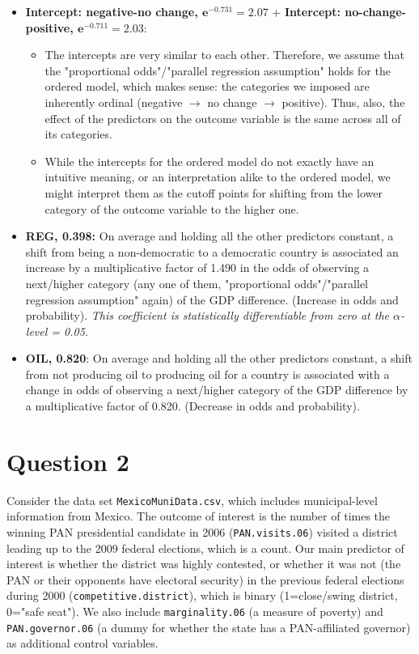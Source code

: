\documentclass[12pt,letterpaper]{article}
\begin{document}
\begin{itemize}
	\item \textbf{Intercept: negative-no change, \( \mathbf{e^{-0.731} = 2.07} \)} + \textbf{Intercept: no-change-positive, \( \mathbf{e^{-0.711} = 2.03} \)}: 
 \begin{itemize}
        \item The intercepts are very similar to each other. Therefore, we assume that the "proportional odds"/"parallel regression assumption" holds for the ordered model, which makes sense: the categories we imposed are inherently ordinal (negative $\rightarrow$ no change $\rightarrow$ positive). Thus, also, the effect of the predictors on the outcome variable is the same across all of its categories. 
        \item While the intercepts for the ordered model do not exactly have an intuitive meaning, or an interpretation alike to the ordered model, we might interpret them as the cutoff points for shifting from the lower category of the outcome variable to the higher one.
    \end{itemize} 
 
	\item \textbf{REG, 0.398:} On average and holding all the other predictors constant, a shift from being a non-democratic to a democratic country is associated an increase by a multiplicative factor of 1.490 in the odds of observing a next/higher category (any one of them, "proportional odds"/"parallel regression assumption" again) of the GDP difference. (Increase in odds and probability).
\textit{This coefficient is statistically differentiable from zero at the $\alpha$-level = 0.05.  }
	\item \textbf{OIL, 0.820}: On average and holding all the other predictors constant, a shift from not producing oil to producing oil for a country is associated with a change in odds of observing a next/higher category of the GDP difference by a multiplicative factor of 0.820. (Decrease in odds and probability).
\end{itemize}

\section*{Question 2} 
\vspace{.25cm}

\noindent Consider the data set \texttt{MexicoMuniData.csv}, which includes municipal-level information from Mexico. The outcome of interest is the number of times the winning PAN presidential candidate in 2006 (\texttt{PAN.visits.06}) visited a district leading up to the 2009 federal elections, which is a count. Our main predictor of interest is whether the district was highly contested, or whether it was not (the PAN or their opponents have electoral security) in the previous federal elections during 2000 (\texttt{competitive.district}), which is binary (1=close/swing district, 0="safe seat"). We also include \texttt{marginality.06} (a measure of poverty) and \texttt{PAN.governor.06} (a dummy for whether the state has a PAN-affiliated governor) as additional control variables. 
\end{document}
